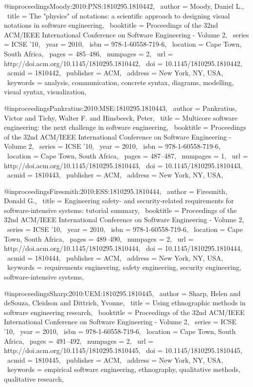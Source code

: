 @inproceedings{Moody:2010:PNS:1810295.1810442,
 author = {Moody, Daniel L.},
 title = {The "physics" of notations: a scientific approach to designing visual notations in software engineering},
 booktitle = {Proceedings of the 32nd ACM/IEEE International Conference on Software Engineering - Volume 2},
 series = {ICSE '10},
 year = {2010},
 isbn = {978-1-60558-719-6},
 location = {Cape Town, South Africa},
 pages = {485--486},
 numpages = {2},
 url = {http://doi.acm.org/10.1145/1810295.1810442},
 doi = {10.1145/1810295.1810442},
 acmid = {1810442},
 publisher = {ACM},
 address = {New York, NY, USA},
 keywords = {analysis, communication, concrete syntax, diagrams, modelling, visual syntax, visualization},
} 

@inproceedings{Pankratius:2010:MSE:1810295.1810443,
 author = {Pankratius, Victor and Tichy, Walter F. and Hinsbeeck, Peter},
 title = {Multicore software engineering: the next challenge in software engineering},
 booktitle = {Proceedings of the 32nd ACM/IEEE International Conference on Software Engineering - Volume 2},
 series = {ICSE '10},
 year = {2010},
 isbn = {978-1-60558-719-6},
 location = {Cape Town, South Africa},
 pages = {487--487},
 numpages = {1},
 url = {http://doi.acm.org/10.1145/1810295.1810443},
 doi = {10.1145/1810295.1810443},
 acmid = {1810443},
 publisher = {ACM},
 address = {New York, NY, USA},
} 

@inproceedings{Firesmith:2010:ESS:1810295.1810444,
 author = {Firesmith, Donald G.},
 title = {Engineering safety- and security-related requirements for software-intensive systems: tutorial summary},
 booktitle = {Proceedings of the 32nd ACM/IEEE International Conference on Software Engineering - Volume 2},
 series = {ICSE '10},
 year = {2010},
 isbn = {978-1-60558-719-6},
 location = {Cape Town, South Africa},
 pages = {489--490},
 numpages = {2},
 url = {http://doi.acm.org/10.1145/1810295.1810444},
 doi = {10.1145/1810295.1810444},
 acmid = {1810444},
 publisher = {ACM},
 address = {New York, NY, USA},
 keywords = {requirements engineering, safety engineering, security engineering, software-intensive systems},
} 

@inproceedings{Sharp:2010:UEM:1810295.1810445,
 author = {Sharp, Helen and deSouza, Cleidson and Dittrich, Yvonne},
 title = {Using ethnographic methods in software engineering research},
 booktitle = {Proceedings of the 32nd ACM/IEEE International Conference on Software Engineering - Volume 2},
 series = {ICSE '10},
 year = {2010},
 isbn = {978-1-60558-719-6},
 location = {Cape Town, South Africa},
 pages = {491--492},
 numpages = {2},
 url = {http://doi.acm.org/10.1145/1810295.1810445},
 doi = {10.1145/1810295.1810445},
 acmid = {1810445},
 publisher = {ACM},
 address = {New York, NY, USA},
 keywords = {empirical software engineering, ethnography, qualitative methods, qualitative research},
} 

